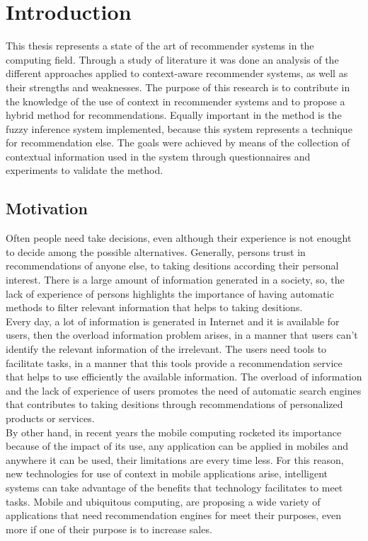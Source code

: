 \chapter{Introduction} \label{introduction} 

This thesis represents a state of the art of recommender systems in
the computing field. Through a study of literature it was done an
analysis of the different approaches applied to context-aware
recommender systems, as well as their strengths and weaknesses. The
purpose of this research is to contribute in the knowledge of the use
of context in recommender systems and to propose a hybrid method for
recommendations. Equally important in the method is the fuzzy
inference system implemented, because this system represents a
technique for recommendation else. The goals were achieved by means
of the collection of contextual information used in the system through
questionnaires and experiments to validate the method.

\section{Motivation}

Often people need take decisions, even although their experience is
not enought to decide among the possible alternatives. Generally,
persons trust in recommendations of anyone else, to taking desitions
according their personal interest. There is a large amount of
information generated in a society, so, the lack of experience of
persons highlights the importance of having automatic methods to
filter relevant information that helps to taking desitions. \\Every day,
a lot of information is generated in Internet and it is available for
users, then the overload information problem arises, in a manner that
users can't identify the relevant information of the irrelevant. The
users need tools to facilitate tasks, in a manner that this tools
provide a recommendation service that helps to use efficiently the
available information. The overload of information and the lack of
experience of users promotes the need of automatic search engines
that contributes to taking desitions through recommendations of
personalized products or services. \\
By other hand, in recent years  the mobile computing rocketed its
importance because of the impact of its use, any application can be
applied in mobiles and anywhere  it can be used,  their limitations
are every time less. For this reason, new technologies for use of
context in mobile applications arise, intelligent systems can take
advantage of the benefits that technology facilitates to meet tasks.
Mobile and ubiquitous
computing\cite{noguera2012mobile},\cite{chiou2010adaptive} are
proposing a wide variety of applications that need recommendation
engines for meet their purposes, even more if one of their purpose 
is to increase sales.

